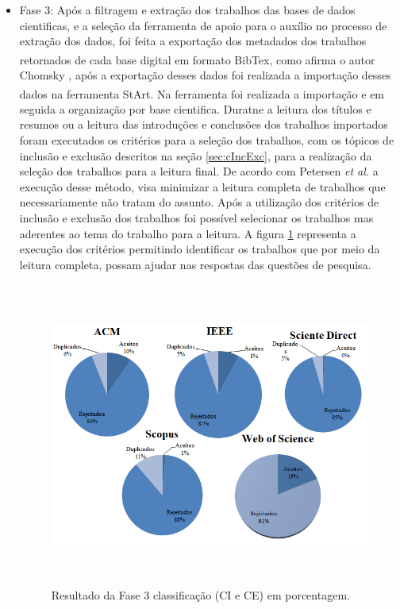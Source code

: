 \begin{itemize}
\item Fase 3: Após a filtragem e extração dos trabalhos das bases de dados cientificas, e a seleção da ferramenta de apoio para o auxílio no processo de extração dos dados, foi feita a exportação dos metadados dos trabalhos retornados de cada base digital em formato BibTex\textsuperscript{\textregistered}, como afirma o autor Chomsky \cite{chomsky1969linguistica}, após a exportação desses dados foi realizada a importação desses dados na ferramenta \acrshort{StArt}\textsuperscript{\textregistered}. Na ferramenta foi realizada a importação e em seguida a organização por base cientifica. Duratne a leitura dos títulos e resumos ou a leitura das introduções e conclusões dos trabalhos importados foram executados os critérios para a seleção dos trabalhos, com os tópicos de inclusão e exclusão descritos na seção \ref{sec:cIncExc}, para a realização da seleção dos trabalhos para a leitura final. De acordo com Petersen \textit{et al.} \cite{petersen2008systematic} a execução desse método, visa minimizar a leitura completa de trabalhos que necessariamente não tratam do assunto. Após a utilização dos critérios de inclusão e exclusão dos trabalhos foi possível selecionar os trabalhos mas aderentes ao tema do trabalho para a leitura. A figura \ref{fig:fase3Criterios} representa a execução dos critérios permitindo identificar os trabalhos que por meio da leitura completa, possam ajudar nas respostas das questões de pesquisa.  


\begin{figure}[!ht]
\centering
\includegraphics[width = 13cm, height=10cm]{img/Classificacao_FASE_3_CI_e_CE.png}
\caption{Resultado da Fase 3 classificação (CI e CE) em porcentagem.}
\label{fig:fase3Criterios}
\end{figure}


\end{itemize}
